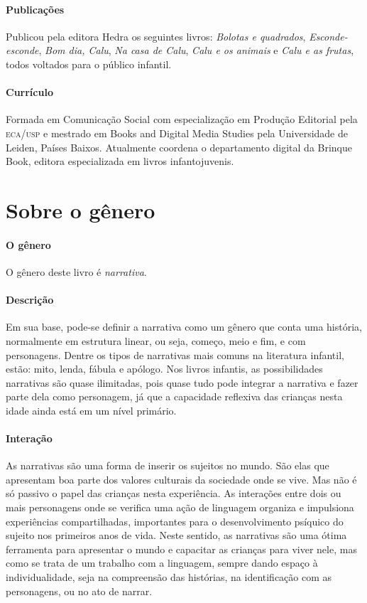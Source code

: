 \documentclass[11pt]{extarticle}
\begin{document}
\paragraph{Publicações}
Publicou pela editora Hedra os seguintes livros: \emph{Bolotas e quadrados},
\emph{Esconde-esconde}, \emph{Bom dia, Calu}, \emph{Na casa de Calu}, \emph{Calu e os animais} e
\emph{Calu e as frutas}, todos voltados para o público infantil.

\paragraph{Currículo} 
Formada em Comunicação Social com 
especialização em Produção Editorial pela \textsc{eca/usp} 
e mestrado em Books and Digital Media Studies pela 
Universidade de Leiden, Países Baixos.
Atualmente coordena o departamento digital da Brinque 
Book, editora especializada em livros infantojuvenis.

\section{Sobre o gênero}

\paragraph{O gênero} O gênero deste livro é \textit{narrativa}. 

\paragraph{Descrição} Em sua base, pode-se definir a narrativa como um gênero que conta uma história, normalmente em estrutura linear, ou seja, começo, meio e fim, e com personagens. 
Dentre os tipos de narrativas mais comuns na literatura infantil, estão: mito, lenda, 
fábula e apólogo. Nos livros infantis, as possibilidades narrativas são quase ilimitadas, pois quase tudo pode integrar a narrativa e fazer parte dela como personagem, já que a capacidade reflexiva das crianças nesta idade ainda está em um nível primário. 



\paragraph{Interação} As narrativas são uma forma de inserir os sujeitos no mundo. 
São elas que apresentam boa parte dos valores culturais da sociedade 
onde se vive. Mas não é só passivo o papel das crianças nesta experiência. 
As interações entre dois ou mais personagens onde se verifica
uma ação de linguagem organiza e impulsiona experiências compartilhadas,
importantes para o desenvolvimento psíquico do sujeito nos primeiros anos de vida.
Neste sentido, as narrativas são uma ótima ferramenta para
apresentar o mundo e capacitar as crianças para viver nele, mas como se
trata de um trabalho com a linguagem, sempre dando espaço à individualidade, 
seja na compreensão das histórias, na identificação com as personagens, ou 
no ato de narrar.
\end{document}
